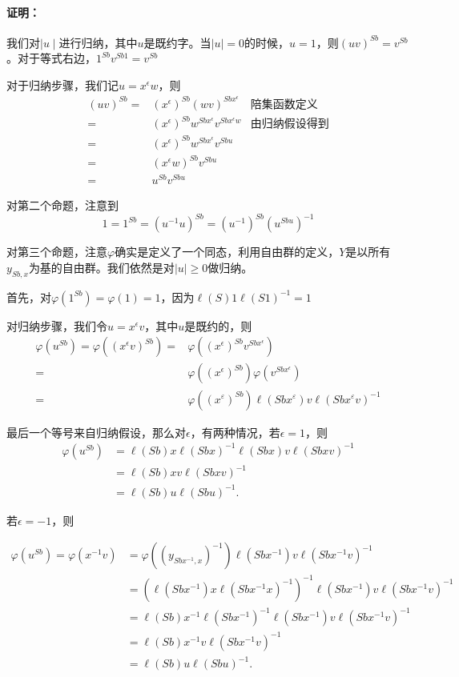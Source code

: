 \documentclass[UTF8]{article}
\begin{document}
	\paragraph{证明：}我们对$\mid u\mid $进行归纳，其中$u$是既约字。当$\mid u \mid = 0$的时候，$u =1$，则$(uv)^{Sb} = v^{Sb}$。对于等式右边，$1^{Sb}v^{Sb1} = v^{Sb}$
	
	对于归纳步骤，我们记$u = x^\epsilon w$，则
	$$
	\begin{aligned}
			(uv)^{Sb} =& (x^\epsilon)^{Sb}(wv)^{Sbx^\epsilon} & \text{陪集函数定义}\\
			=&(x^\epsilon)^{Sb} w^{Sbx^\epsilon}v^{Sbx^\epsilon w}& \text{由归纳假设得到}\\
			=&(x^\epsilon)^{Sb}w^{Sbx^\epsilon} v^{Sbu}\\
			=& (x^\epsilon w)^{Sb} v^{Sbu}\\
			=& u^{Sb}v^{Sbu}
	\end{aligned}
	$$
	
	对第二个命题，注意到
	$$
	1 = 1^{Sb} = (u^{-1}u)^{Sb} = (u^{-1})^{Sb} (u^{Sbu})^{-1}
	$$
	
	对第三个命题，注意$\varphi$确实是定义了一个同态，利用自由群的定义，$Y$是以所有$y_{Sb,x}$为基的自由群。我们依然是对$\mid u\mid \geq  0$做归纳。 
	
	首先，对$\varphi(1^{Sb}) = \varphi(1) = 1$，因为$\ell(S)1\ell(S1)^{-1} = 1$
	
	对归纳步骤，我们令$u = x^\epsilon v$，其中$u$是既约的，则
	$$ 
	\begin{aligned}
			\varphi(u^{Sb}) = \varphi((x^\epsilon v)^{Sb}) = &\varphi((x^\epsilon)^{Sb} v^{Sbx^\epsilon})\\
		=& \varphi((x^\epsilon)^{Sb})\varphi(v^{Sbx^\epsilon})\\
		=& \varphi\left((x^{\varepsilon})^{Sb}\right)\ell(Sb x^{\varepsilon}) v \ell(Sb x^{\varepsilon} v)^{-1}
	\end{aligned}
	$$
	
	最后一个等号来自归纳假设，那么对$\epsilon$，有两种情况，若$\epsilon = 1$，则
	$$
	\begin{aligned}
		\varphi(u^{Sb}) &= \ell(Sb) x \ell(Sb x)^{-1} \ell(Sb x) v \ell(Sb x v)^{-1} \\
		&= \ell(Sb) x v \ell(Sb x v)^{-1} \\
		&= \ell(Sb) u \ell(Sb u)^{-1}.
	\end{aligned}
	$$
	
	若$\epsilon = -1$，则
	
	$$
	\begin{aligned}
		\varphi(u^{Sb}) =\varphi(x^{-1}v) &=  \varphi((y_{Sbx^{-1},x})^{-1})\ell(Sbx^{-1})v\ell(Sbx^{-1}v)^{-1}\\
		&= \left(\ell(Sbx^{-1}) x \ell(Sbx^{-1}x)^{-1}\right)^{-1} \ell(Sbx^{-1}) v \ell(Sbx^{-1}v)^{-1} \\
		&= \ell(Sb) x^{-1} \ell(Sbx^{-1})^{-1} \ell(Sbx^{-1}) v \ell(Sbx^{-1}v)^{-1} \\
		&= \ell(Sb) x^{-1} v \ell(Sbx^{-1}v)^{-1} \\
		&= \ell(Sb) u \ell(Sbu)^{-1}.
	\end{aligned}
	$$
	
\end{document}
